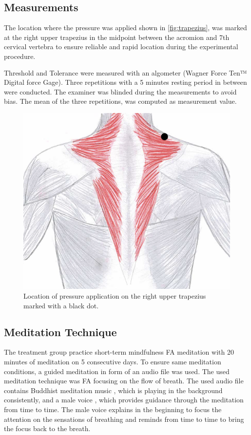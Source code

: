 \subsection{Measurements}%
The location where the pressure was applied shown in \autoref{fig:trapezius}, was marked at the right upper trapezius in the midpoint between the acromion and 7th cervical vertebra to ensure reliable and rapid location during the experimental procedure. 

Threshold and Tolerance were measured with an algometer (Wagner Force Ten™ Digital force Gage). Three repetitions with a 5 minutes resting period in between were conducted. The examiner was blinded during the measurements to avoid bias. The mean of the three repetitions, was computed as measurement value. 

\begin{figure}[H]
\centering
\includegraphics[width=.7\columnwidth]{../figures/trapezius}
\caption{Location of pressure application on the right upper trapezius marked with a black dot.}
\label{fig:trapezius}
\end{figure} \vspace{-.5cm}


\subsection{Meditation Technique}
The treatment group practice short-term mindfulness FA meditation with 20 minutes of meditation on 5 consecutive days. To ensure same meditation conditions, a guided meditation in form of an audio file was used. The used meditation technique was FA focusing on the flow of breath. The used audio file contains Buddhist meditation music \cite{BuddhistMusic}, which is playing in the background consistently, and a male voice \cite{Noyce2018}, which provides guidance through the meditation from time to time.  The male voice explains in the beginning to focus the attention on the sensations of breathing and reminds from time to time to bring the focus back to the breath. 

